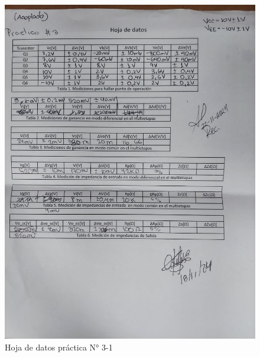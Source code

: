 \begin{figure}[ht]
    \centering
    \includegraphics[width=1.0\textwidth]{src/images/p3/p3-hoja-de-datos.jpg}
    \caption{Hoja de datos práctica N° 3-1}
    \label{fig:hoja-de-datos-p3-1}
\end{figure}

